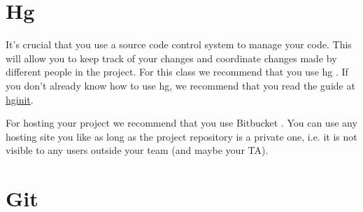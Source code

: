 \begin{appendices}
\section{Hg}

It's crucial that you use a source code control system to manage your \projectname code. This will
allow you to keep track of your changes and coordinate changes made by different people in the 
project. For this class we recommend that you use hg \cite{tortoiseHg}. If you don’t
already know how to use hg, we recommend that you read the guide at \href{http://hginit.com/}{hginit}.

For hosting your project we recommend that you use Bitbucket \cite{bitbucket}. You can use any 
hosting site you like as long as the project repository is a private one, i.e. it is not visible to
any users outside your team (and maybe your TA).

\section{Git}


\end{appendices}
